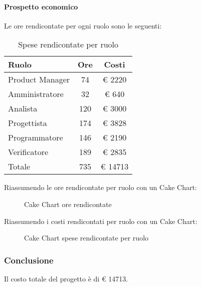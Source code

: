 			\paragraph{Prospetto economico}
				Le ore rendicontate per ogni ruolo sono le seguenti:
				\begin{table}
					\begin{center}
						\begin{tabular}{| l | c | c |}
							\hline
							Ruolo 				& Ore 		& Costi  \\ \hline
							
							Product Manager		& 74 		& \euro{} 2220 	\\
							Amministratore 		& 32 		& \euro{} 640 	\\
							Analista	 		& 120 		& \euro{} 3000 	\\
							Progettista 		& 174 		& \euro{} 3828  	\\
							Programmatore		& 146 		& \euro{} 2190 	\\
							Verificatore		& 189 		& \euro{} 2835 	\\ \hline \hline
							
							Totale	 			& 735 		& \euro{} 14713 	\\ \hline
						\end{tabular}
					\end{center}
					\caption{Spese rendicontate per ruolo}
				\end{table}
				Riassumendo le ore rendicontate per ruolo con un Cake Chart:
				\begin{figure}\centering
					\caption{Cake Chart ore rendicontate}
				\end{figure}
				Riassumendo i costi rendicontati per ruolo con un Cake Chart:
				\begin{figure}\centering
					\caption{Cake Chart spese rendicontate per ruolo}
				\end{figure}
		\subsubsection{Conclusione}
			Il costo totale del progetto è di \euro{} 14713.
